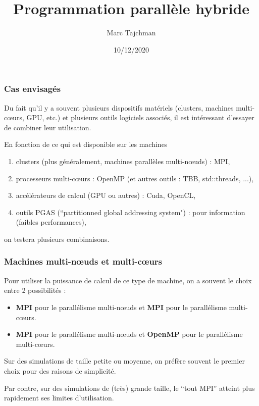 \documentclass{beamer}
\title{Programmation parallèle hybride}
\author{Marc Tajchman}\institute{CEA - DEN/DM2S/STMF/LMES}
\date{10/12/2020}
\begin{document}
\begin{frame}
	\titlepage
\end{frame}

\large
\begin{frame}
	\frametitle{Cas envisagés}

Du fait qu'il y a souvent plusieurs dispositifs matériels (clusters, machines multi-c\oe urs, GPU, etc.) et plusieurs outils logiciels associés, il est intéressant d'essayer de combiner leur utilisation.

\vfill
En fonction de ce qui est disponible sur les machines
\begin{enumerate}
	\item clusters (plus généralement, machines parallèles multi-n\oe uds) : MPI,
	\item processeurs multi-c\oe urs : OpenMP (et autres outils : TBB, std::threads, ...),
	\item accélérateurs de calcul (GPU ou autres) : Cuda, OpenCL,
	\item outils PGAS (``partitionned global addressing system") : pour information (faibles performances),
\end{enumerate}

\vfill
on testera plusieurs combinaisons.
\end{frame}

\begin{frame}
\frametitle{Machines multi-n\oe uds et multi-c\oe urs}

Pour utiliser la puissance de calcul de ce type de machine, on a souvent le choix entre 2 possibilités :
\medskip
\begin{itemize}
	\item {\bf MPI} pour le parallélisme multi-n\oe uds et {\bf MPI} pour le parallélisme multi-c\oe urs.
\medskip
	\item {\bf MPI} pour le parallélisme multi-n\oe uds et {\bf OpenMP} pour le parallélisme multi-c\oe urs.
\end{itemize}
\vfill

Sur des simulations de taille petite ou moyenne, on préfère souvent le premier choix pour des raisons de simplicité. 

Par contre, sur des simulations de (très) grande taille, le ``tout MPI'' atteint plus rapidement ses limites d'utilisation.
\end{frame}
\end{document}
